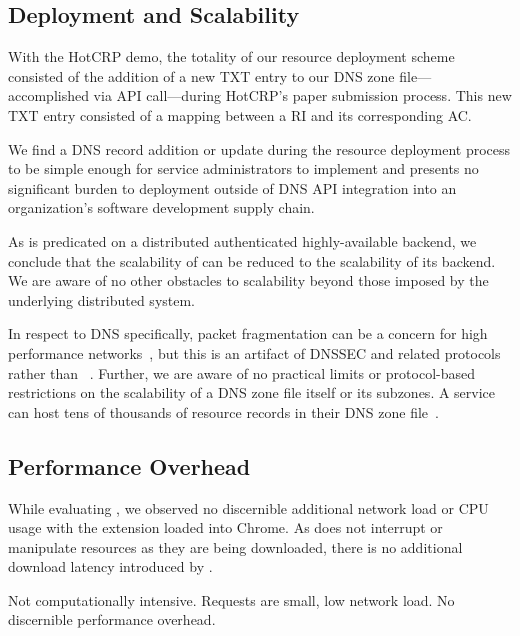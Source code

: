 
\subsection{Deployment and Scalability}

With the HotCRP demo, the totality of our resource deployment scheme consisted
of the addition of a new TXT entry to our DNS zone file---accomplished via API
call---during HotCRP's paper submission process. This new TXT entry consisted of
a mapping between a RI and its corresponding AC.

We find a DNS record addition or update during the resource deployment process
to be simple enough for service administrators to implement and presents no
significant burden to deployment outside of DNS API integration into an
organization's software development supply chain.

As \SYSTEM{} is predicated on a distributed authenticated highly-available
backend, we conclude that the scalability of \SYSTEM{} can be reduced to the
scalability of its backend. We are aware of no other obstacles to scalability
beyond those imposed by the underlying distributed system.

In respect to DNS specifically, packet fragmentation can be a concern for high
performance networks~\cite{EDNS}, but this is an artifact of DNSSEC and related
protocols rather than \SYSTEM{}~\cite{DNSSEC}. Further, we are aware of no
practical limits or protocol-based restrictions on the scalability of a DNS zone
file itself or its subzones. A service can host tens of thousands of resource
records in their DNS zone file~\cite{DNS1, DNS2}.

\subsection{Performance Overhead}


While evaluating \SYSTEM{}, we observed no discernible additional network load
or CPU usage with the extension loaded into Chrome. As \SYSTEM{} does not
interrupt or manipulate resources as they are being downloaded, there is no
additional download latency introduced by \SYSTEM{}. 

Not computationally intensive. Requests are small, low network load. No
discernible performance overhead.
